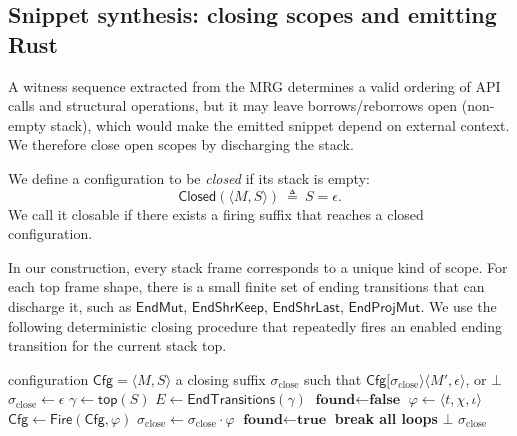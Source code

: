 \documentclass[sigconf]{acmart}
\begin{document}
\subsection{Snippet synthesis: closing scopes and emitting Rust}
\label{sec:analysis:synth}
A witness sequence extracted from the MRG determines a valid ordering of API calls and structural operations,
but it may leave borrows/reborrows open (non-empty stack), which would make the emitted snippet depend on external context.
We therefore close open scopes by discharging the stack.

We define a configuration to be \emph{closed} if its stack is empty:
\begin{equation*}
    \mathsf{Closed}(\langle M,S\rangle)\ \triangleq\ S=\epsilon.
\end{equation*}
We call it closable if there exists a firing suffix that reaches a closed configuration.

In our construction, every stack frame corresponds to a unique kind of scope. For each top frame shape, there is a small finite set of ending transitions that can discharge it, such as $\mathsf{EndMut}$, $\mathsf{EndShrKeep}$, $\mathsf{EndShrLast}$, $\mathsf{EndProjMut}$. We use the following deterministic closing procedure that repeatedly fires an enabled ending transition for the current stack top.

\begin{algorithm}[t]
\caption{$\mathsf{CloseStack}(\mathsf{Cfg})$}
\label{alg:closestack}
\begin{algorithmic}[1]
\REQUIRE configuration $\mathsf{Cfg}=\langle M,S\rangle$
\ENSURE a closing suffix $\sigma_{\mathrm{close}}$ such that $\mathsf{Cfg}[\sigma_{\mathrm{close}}\rangle \langle M',\epsilon\rangle$, or $\bot$
\STATE $\sigma_{\mathrm{close}}\gets \epsilon$
  \STATE $\gamma \gets \mathsf{top}(S)$
  \STATE $E \gets \mathsf{EndTransitions}(\gamma)$ 
  \STATE $\textbf{found}\gets \textbf{false}$
        \STATE $\varphi\gets \langle t,\chi,\iota\rangle$
        \STATE $\mathsf{Cfg}\gets \mathsf{Fire}(\mathsf{Cfg},\varphi)$
        \STATE $\sigma_{\mathrm{close}}\gets \sigma_{\mathrm{close}}\cdot \varphi$
        \STATE $\textbf{found}\gets \textbf{true}$
        \STATE \textbf{break all loops}
      \ENDFOR
    \ENDFOR
  \ENDFOR
   \RETURN $\bot$ \ENDIF
\ENDWHILE
\RETURN $\sigma_{\mathrm{close}}$
\end{algorithmic}
\end{algorithm}
\end{document}
